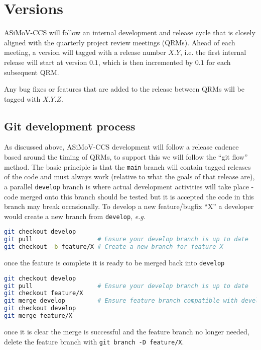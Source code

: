 \documentclass[11pt]{article}
\begin{document}
\section{Versions}
ASiMoV-CCS will follow an internal development and release cycle that is closely aligned with the quarterly project review meetings (QRMs). Ahead of 
each meeting, a version will tagged with a release number $X.Y$, i.e. the first internal release will start at version $0.1$, which 
is then incremented by $0.1$ for each subsequent QRM. 

Any bug fixes or features that are added to the release between QRMs will be tagged with $X.Y.Z$.

\subsection{Git development process}
As discussed above, ASiMoV-CCS development will follow a release cadence based around the timing of
QRMs, to support this we will follow the ``git flow'' method.
The basic principle is that the \texttt{main} branch will contain tagged releases of the code and
must always work (relative to what the goals of that release are), a parallel \texttt{develop}
branch is where actual development activities will take place - code merged onto this branch should
be tested but it is accepted the code in this branch may break occasionally.
To develop a new feature/bugfix ``X'' a developer would create a new branch from \texttt{develop},
\textit{e.g.}
\begin{lstlisting}[language=sh, basicstyle=\fontsize{9}{10}\ttfamily\label{lst:feature-branch}]
git checkout develop
git pull                  # Ensure your develop branch is up to date
git checkout -b feature/X # Create a new branch for feature X
\end{lstlisting}
once the feature is complete it is ready to be merged back into \texttt{develop}
\begin{lstlisting}[language=sh, basicstyle=\fontsize{9}{10}\ttfamily\label{lst:feature-merge}]
git checkout develop
git pull                  # Ensure your develop branch is up to date
git checkout feature/X
git merge develop         # Ensure feature branch compatible with develop
git checkout develop
git merge feature/X
\end{lstlisting}
once it is clear the merge is successful and the feature branch no longer needed, delete the feature
branch with \texttt{git branch -D feature/X}.
\end{document}
